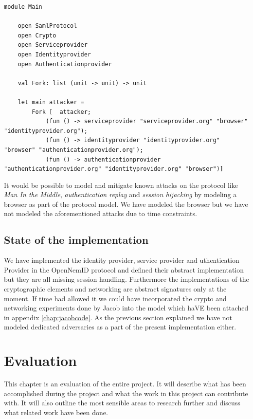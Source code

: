 \documentclass[twosided]{report}
\begin{document}
\begin{lstlisting}[style=fstar, caption={Main module for introducing adversaries}, label={list:adversary}]
	module Main

	open SamlProtocol
	open Crypto
	open Serviceprovider
	open Identityprovider
	open Authenticationprovider

	val Fork: list (unit -> unit) -> unit	

	let main attacker =	
		Fork [	attacker;
			(fun () -> serviceprovider "serviceprovider.org" "browser" "identityprovider.org");
			(fun () -> identityprovider "identityprovider.org" "browser" "authenticationprovider.org");
			(fun () -> authenticationprovider "authenticationprovider.org" "identityprovider.org" "browser")]
\end{lstlisting}

It would be possible to model and mitigate known attacks on the protocol like \emph{Man In the Middle}, \emph{authentication replay} and \emph{session hijacking} by modeling a browser as part of the protocol model. We have modeled the browser but we have not modeled the aforementioned attacks due to time constraints.

\section{State of the implementation}
We have implemented the identity provider, service provider and uthentication Provider in the OpenNemID protocol and defined their abstract implementation but they are all missing session handling. Furthermore the implementations of the cryptographic elements and networking are abstract signatures only at the moment. If time had allowed it we could have incorporated the crypto and networking experiments done by Jacob into the model which haVE been attached in appendix \ref{chap:jacobcode}. As the previous section explained we have not modeled dedicated adversaries as a part of the present implementation either.


\chapter{Evaluation}
This chapter is an evaluation of the entire project. It will describe what has been accomplished during the project and what the work in this project can contribute with. It will also outline the most sensible areas to research further and discuss what related work have been done.
\end{document}
